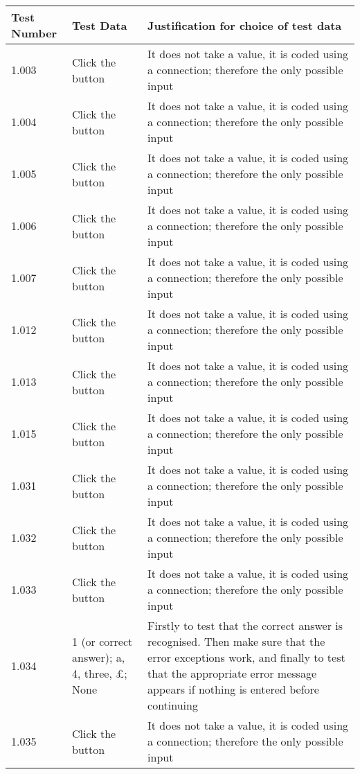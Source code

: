 \begin{landscape}
\begin{center}
\begin{longtable}{|p{4cm}|p{4cm}|p{5cm}|} \hline
\textbf{Test Number} & \textbf{Test Data} & \textbf{Justification for choice of test data} \\ \hline
1.003 & Click the button & It does not take a value, it is coded using a connection; therefore the only possible input \\ \hline
1.004 & Click the button & It does not take a value, it is coded using a connection; therefore the only possible input \\ \hline
1.005 & Click the button & It does not take a value, it is coded using a connection; therefore the only possible input \\ \hline
1.006 & Click the button & It does not take a value, it is coded using a connection; therefore the only possible input \\ \hline
1.007 & Click the button & It does not take a value, it is coded using a connection; therefore the only possible input \\ \hline
1.012 & Click the button & It does not take a value, it is coded using a connection; therefore the only possible input \\ \hline
1.013 & Click the button & It does not take a value, it is coded using a connection; therefore the only possible input \\ \hline
1.015 & Click the button & It does not take a value, it is coded using a connection; therefore the only possible input \\ \hline
1.031 & Click the button & It does not take a value, it is coded using a connection; therefore the only possible input \\ \hline
1.032 & Click the button & It does not take a value, it is coded using a connection; therefore the only possible input \\ \hline
1.033 & Click the button & It does not take a value, it is coded using a connection; therefore the only possible input \\ \hline
1.034 & 1 (or correct answer); a, 4, three, £; None & Firstly to test that the correct answer is recognised. Then make sure that the error exceptions work, and finally to test that the appropriate error message appears if nothing is entered before continuing \\ \hline
1.035 & Click the button & It does not take a value, it is coded using a connection; therefore the only possible input \\ \hline

\end{longtable}
\end{center}
\end{landscape}
